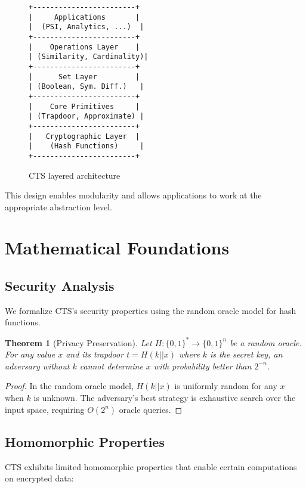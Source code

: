 \documentclass[10pt,conference]{IEEEtran}
\newtheorem{theorem}{Theorem}
\begin{document}
\begin{figure}[h]
\centering
\begin{lstlisting}[language={},basicstyle=\scriptsize\ttfamily,frame=single]
+------------------------+
|     Applications       |
|  (PSI, Analytics, ...)  |
+------------------------+
|    Operations Layer    |
| (Similarity, Cardinality)|
+------------------------+
|      Set Layer         |
| (Boolean, Sym. Diff.)   |
+------------------------+
|    Core Primitives     |
| (Trapdoor, Approximate) |
+------------------------+
|   Cryptographic Layer  |
|    (Hash Functions)     |
+------------------------+
\end{lstlisting}
\caption{CTS layered architecture}
\label{fig:architecture}
\end{figure}

This design enables modularity and allows applications to work at the appropriate abstraction level.

\section{Mathematical Foundations}
\label{sec:theory}

\subsection{Security Analysis}

We formalize CTS's security properties using the random oracle model for hash functions.

\begin{theorem}[Privacy Preservation]
Let $H: \{0,1\}^* \rightarrow \{0,1\}^n$ be a random oracle. For any value $x$ and its trapdoor $t = H(k||x)$ where $k$ is the secret key, an adversary without $k$ cannot determine $x$ with probability better than $2^{-n}$.
\end{theorem}

\begin{proof}
In the random oracle model, $H(k||x)$ is uniformly random for any $x$ when $k$ is unknown. The adversary's best strategy is exhaustive search over the input space, requiring $O(2^n)$ oracle queries.
\end{proof}

\subsection{Homomorphic Properties}

CTS exhibits limited homomorphic properties that enable certain computations on encrypted data:
\end{document}
